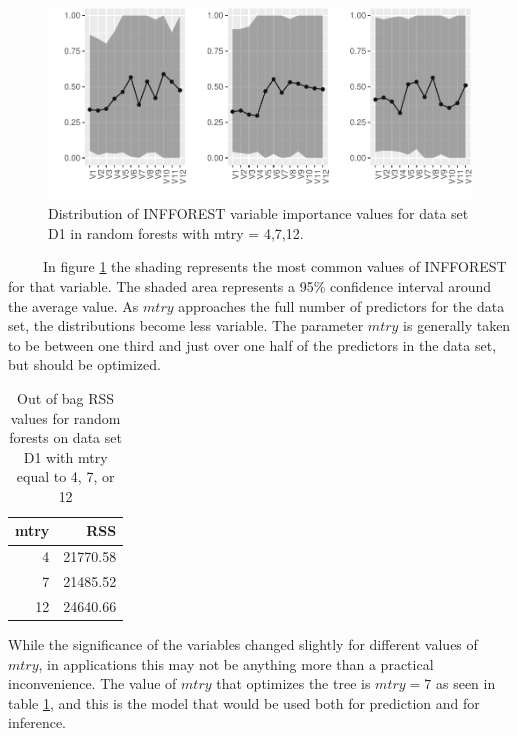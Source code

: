 \documentclass[12pt,twoside]{reedthesis}
\begin{document}
  \begin{figure}[htbp]
  \centering
  \includegraphics{Thesis_files/figure-latex/unnamed-chunk-28-1.pdf}
  \caption{\label{fig:unnamed-chunk-28}\label{fig:figmtry}Distribution of
  INFFOREST variable importance values for data set D1 in random forests
  with mtry = 4,7,12.}
  \end{figure}
  
  ~~~~~In figure \ref{fig:figmtry} the shading represents the most common
  values of INFFOREST for that variable. The shaded area represents a 95\%
  confidence interval around the average value. As \(mtry\) approaches the
  full number of predictors for the data set, the distributions become
  less variable. The parameter \(mtry\) is generally taken to be between
  one third and just over one half of the predictors in the data set, but
  should be optimized.
  
  \begin{table}
  
  \caption{\label{tab:unnamed-chunk-29}\label{tab:tabrssRF}Out of bag RSS values for random forests on data set D1 with mtry equal to 4, 7, or 12}
  \centering
  \begin{tabular}[t]{r|r}
  \hline
  mtry & RSS\\
  \hline
  4 & 21770.58\\
  \hline
  7 & 21485.52\\
  \hline
  12 & 24640.66\\
  \hline
  \end{tabular}
  \end{table}
  
  While the significance of the variables changed slightly for different
  values of \(mtry\), in applications this may not be anything more than a
  practical inconvenience. The value of \(mtry\) that optimizes the tree
  is \(mtry = 7\) as seen in table \ref{tab:tabrssRF}, and this is the
  model that would be used both for prediction and for inference.
  
\end{document}
